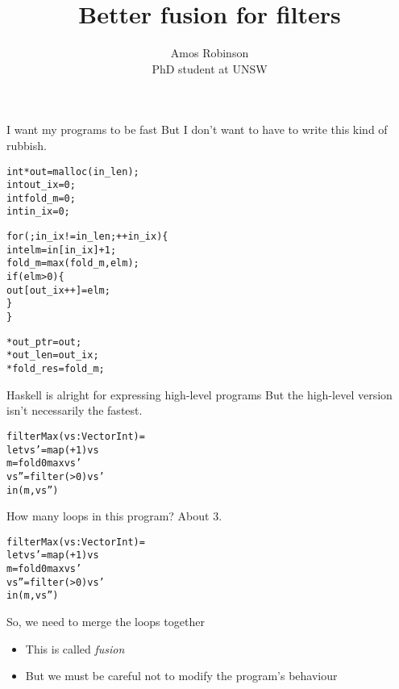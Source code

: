 \documentclass{beamer}
\newcommand{\bl}[1]{\textcolor[rgb]{0.0,0.5,0.9}{#1}}
\newcommand{\g}[1]{\textcolor[rgb]{0.7,0.3,0.3}{#1}}
\newcommand{\fr}[1]{\begin{frame}[fragile]{#1}}
\begin{document}
\title{Better fusion for filters}
\author{Amos Robinson\\PhD student at UNSW}

\frame{\titlepage}


\fr{I want my programs to be fast}
But I don't want to have to write this kind of rubbish.

\begin{alltt}
int  *\bl{out}    = malloc(\bl{in_len});
int   \bl{out_ix} = 0;
int   \bl{fold_m} = 0;
int   \bl{in_ix}  = 0;

\g{for} (; \bl{in_ix} != \bl{in_len}; ++\bl{in_ix}) \{
  int \bl{elm} = \bl{in}[\bl{in_ix}] + 1;
  \bl{fold_m}  = max(\bl{fold_m}, \bl{elm});
  \g{if} (\bl{elm} > 0) \{
      \bl{out}[\bl{out_ix}++] = \bl{elm};
  \}
\}

*\bl{out_ptr} = \bl{out};
*\bl{out_len} = \bl{out_ix};
*\bl{fold_res}= \bl{fold_m};
\end{alltt}

\end{frame}



\fr{Haskell is alright for expressing high-level programs}
But the high-level version isn't necessarily the fastest.

\begin{alltt}
filterMax (\bl{vs} : Vector Int) =
 let \bl{vs'} = \g{map}    (+1)    \bl{vs}
     \bl{m}   = \g{fold}     0 max \bl{vs'}
     \bl{vs''}= \g{filter} (>0)    \bl{vs'}
 in (\bl{m}, \bl{vs''})
\end{alltt}

\end{frame}


\fr{How many loops in this program?}
About 3.

\begin{alltt}
filterMax (\bl{vs} : Vector Int) =
 let \bl{vs'} = \g{map}    (+1)    \bl{vs}
     \bl{m}   = \g{fold}     0 max \bl{vs'}
     \bl{vs''}= \g{filter} (>0)    \bl{vs'}
 in (\bl{m}, \bl{vs''})
\end{alltt}

\end{frame}


\fr{So, we need to merge the loops together}
\begin{itemize}
\item
This is called \emph{fusion}
\item
But we must be careful not to modify the program's behaviour
\end{itemize}
\end{frame}
\end{document}
